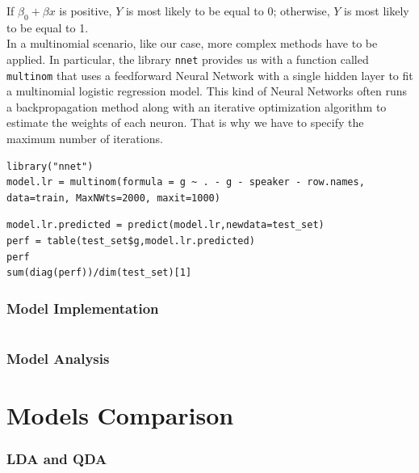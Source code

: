 \documentclass[]{report}
\begin{document}
If $\beta_0 + \beta x$ is positive, $Y$ is most likely to be equal to 0; otherwise, $Y$ is most likely to be equal to 1.  \\

In a multinomial scenario, like our case, more complex methods have to be applied. In particular, the library \texttt{nnet} provides us with a function called \texttt{multinom} that uses a feedforward Neural Network with a single hidden layer to fit a multinomial logistic regression model. This kind of Neural Networks often runs a backpropagation method along with an iterative optimization algorithm to estimate the weights of each neuron. That is why we have to specify the maximum number of iterations.

\begin{lstlisting}
library("nnet")
model.lr = multinom(formula = g ~ . - g - speaker - row.names, data=train, MaxNWts=2000, maxit=1000)
\end{lstlisting}

\begin{lstlisting}
model.lr.predicted = predict(model.lr,newdata=test_set)
perf = table(test_set$g,model.lr.predicted)
perf
sum(diag(perf))/dim(test_set)[1]
\end{lstlisting}
\subsubsection{Model Implementation}
\begin{lstlisting}
\end{lstlisting}
\subsubsection{Model Analysis}


\section{Models Comparison}

\subsubsection{LDA and QDA}
\end{document}
